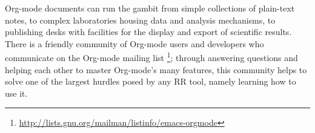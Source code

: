 \documentclass[11pt]{article}
\begin{document}
Org-mode documents can run the gambit from simple collections of
plain-text notes, to complex laboratories housing data and analysis
mechanisms, to publishing desks with facilities for the display and
export of scientific results.  There is a friendly community of
Org-mode users and developers who communicate on the Org-mode
mailing list \footnote{\href{http://lists.gnu.org/mailman/listinfo/emacs-orgmode}{http://lists.gnu.org/mailman/listinfo/emacs-orgmode} }; through answering questions and helping each
other to master Org-mode's many features, this community helps to
solve one of the largest hurdles posed by any RR tool, namely learning
how to use it.



\end{document}

